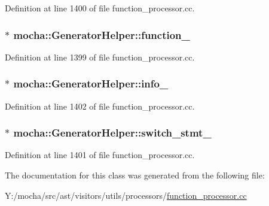 Definition at line 1400 of file function\_\-processor.cc.

\hypertarget{classmocha_1_1_generator_helper_a5793b280bcbc653e308a28232586348a}{
\subsubsection[{function\_\-}]{$\ast$ {\bf mocha::GeneratorHelper::function\_\-}}}
\label{classmocha_1_1_generator_helper_a5793b280bcbc653e308a28232586348a}


Definition at line 1399 of file function\_\-processor.cc.

\hypertarget{classmocha_1_1_generator_helper_a03e380a9853c407fcc82b95f023f0580}{
\subsubsection[{info\_\-}]{$\ast$ {\bf mocha::GeneratorHelper::info\_\-}}}
\label{classmocha_1_1_generator_helper_a03e380a9853c407fcc82b95f023f0580}


Definition at line 1402 of file function\_\-processor.cc.

\hypertarget{classmocha_1_1_generator_helper_ac158c66e2b050d5a993fccf33153c404}{
\subsubsection[{switch\_\-stmt\_\-}]{$\ast$ {\bf mocha::GeneratorHelper::switch\_\-stmt\_\-}}}
\label{classmocha_1_1_generator_helper_ac158c66e2b050d5a993fccf33153c404}


Definition at line 1401 of file function\_\-processor.cc.



The documentation for this class was generated from the following file:\begin{DoxyCompactItemize}
\item 
Y:/mocha/src/ast/visitors/utils/processors/\hyperlink{function__processor_8cc}{function\_\-processor.cc}\end{DoxyCompactItemize}
